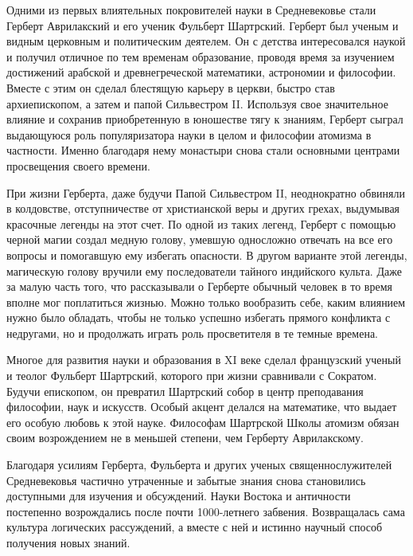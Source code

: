 Одними из первых влиятельных покровителей науки в Средневековье стали Герберт Аврилакский и его ученик Фульберт Шартрский.
Герберт был ученым и видным церковным и политическим деятелем.
Он с детства интересовался наукой и получил отличное по тем временам образование, проводя время за изучением достижений арабской и древнегреческой математики, астрономии и философии.
Вместе с этим он сделал блестящую карьеру в церкви, быстро став архиепископом, а затем и папой Сильвестром II.
Используя свое значительное влияние и сохранив приобретенную в юношестве тягу к знаниям, Герберт сыграл выдающуюся роль популяризатора науки в целом и философии атомизма в частности.
Именно благодаря нему монастыри снова стали основными центрами просвещения своего времени.

При жизни Герберта, даже будучи Папой Сильвестром II, неоднократно обвиняли в колдовстве, отступничестве от христианской веры и других грехах, выдумывая красочные легенды на этот счет.
По одной из таких легенд, Герберт с помощью черной магии создал медную голову, умевшую односложно отвечать на все его вопросы и помогавшую ему избегать опасности.
В другом варианте этой легенды, магическую голову вручили ему последователи тайного индийского культа.
Даже за малую часть того, что рассказывали о Герберте обычный человек в то время вполне мог поплатиться жизнью.
Можно только вообразить себе, каким влиянием нужно было обладать, чтобы не только успешно избегать прямого конфликта с недругами, но и продолжать играть роль просветителя в те темные времена.

Многое для развития науки и образования в XI веке сделал французский ученый и теолог Фульберт Шартрский, которого при жизни сравнивали с Сократом.
Будучи епископом, он превратил Шартрский собор в центр преподавания философии, наук и искусств.
Особый акцент делался на математике, что выдает его особую любовь к этой науке.
Философам Шартрской Школы атомизм обязан своим возрождением не в меньшей степени, чем Герберту Аврилакскому.

Благодаря усилиям Герберта, Фульберта и других ученых священнослужителей Средневековья частично утраченные и забытые знания снова становились доступными для изучения и обсуждений.
Науки Востока и античности постепенно возрождались после почти 1000-летнего забвения.
Возвращалась сама культура логических рассуждений, а вместе с ней и истинно научный способ получения новых знаний.

